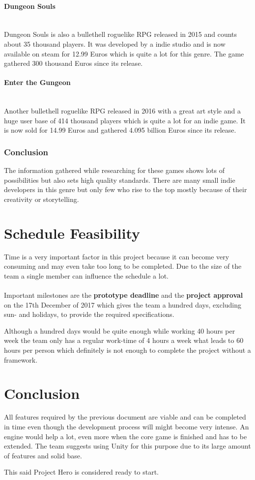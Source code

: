 \documentclass[11pt]{article}
\begin{document}
\paragraph{Dungeon Souls}~\\
Dungeon Souls is also a bullethell roguelike RPG released in 2015 and counts about 35 thousand players. It was developed by a indie studio and is now available on steam for 12.99 Euros which is quite a lot for this genre. 
The game gathered 300 thousand Euros since its release.

\paragraph{Enter the Gungeon}~\\
Another bullethell roguelike RPG released in 2016 with a great art style and a huge user base of 414 thousand players which is quite a lot for an indie game. 
It is now sold for 14.99 Euros and gathered 4.095 billion Euros since its release.

\subsubsection{Conclusion}
The information gathered while researching for these games shows lots of possibilities but also sets high quality standards. 
There are many small indie developers in this genre but only few who rise to the top mostly because of their creativity or storytelling.

\section{Schedule Feasibility}
Time is a very important factor in this project because it can become very consuming and may even take too long to be completed.
Due to the size of the team a single member can influence the schedule a lot.
\\
\\
Important milestones are the \textbf{prototype deadline} and the \textbf{project approval} on the 17th December of 2017 which gives the team a hundred days, excluding sun- and holidays, to provide the required specifications.

Although a hundred days would be quite enough while working 40 hours per week the team only has a regular work-time of 4 hours a week what leads to 60 hours per person which definitely is not enough to complete the project without a framework.

\section{Conclusion}
All features required by the previous document are viable and can be completed in time even though the development process will might become very intense.
An engine would help a lot, even more when the core game is finished and has to be extended. The team suggests using Unity for this purpose due to its large amount of features and solid base.

This said Project Hero is considered ready to start.
\end{document}
